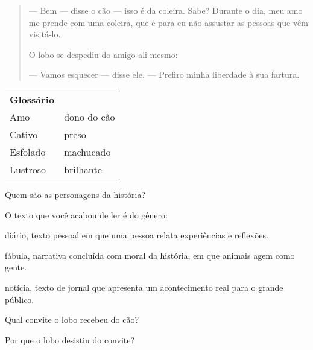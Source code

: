 \begin{escolha}
\begin{escolha}
\begin{escolha}
\begin{quote}
--- Bem --- disse o cão --- isso é da coleira. Sabe? Durante o dia,
meu amo me prende com uma coleira, que é para eu não assustar as pessoas
que vêm visitá-lo.

O lobo se despediu do amigo ali mesmo:

--- Vamos esquecer --- disse ele. --- Prefiro minha liberdade à sua
fartura.
\end{quote}


\begin{tabular}{ll}
\textbf{Glossário} & \mbox{}\\
Amo & dono do cão\\
Cativo & preso\\
Esfolado & machucado\\
Lustroso & brilhante\\
\end{tabular}

\begin{escolha}
\item Quem são as personagens da história?


\item O texto que você acabou de ler é do gênero:

\begin{boxlist}
\boxitem[] diário, texto pessoal em que uma pessoa relata experiências e reflexões.

\boxitem[\rosa{X}] fábula, narrativa concluída com moral da história, em que animais agem como gente.

\boxitem[] notícia, texto de jornal que apresenta um acontecimento real para o grande público.
\end{boxlist}

\item Qual convite o lobo recebeu do cão?


\item Por que o lobo desistiu do convite?



\end{escolha}
\end{escolha}
\end{escolha}
\end{escolha}
